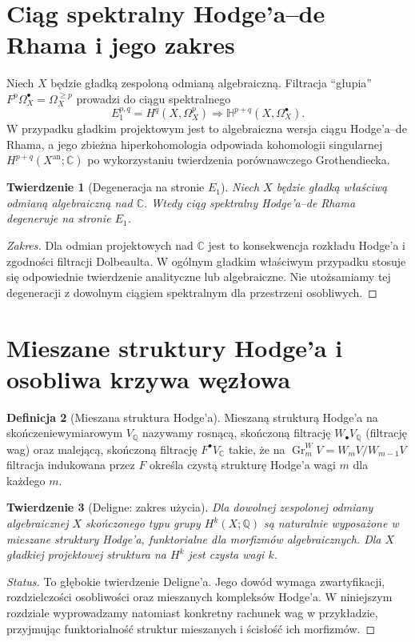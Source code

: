 \documentclass[11pt,a4paper,oneside]{report}
\newcommand{\C}{\mathbb{C}}
\newcommand{\Q}{\mathbb{Q}}
\theoremstyle{plain}
\newtheorem{twierdzenie}{Twierdzenie}[section]
\theoremstyle{definition}
\newtheorem{definicja}[twierdzenie]{Definicja}
\theoremstyle{remark}
\begin{document}
\section{Ciąg spektralny Hodge'a--de Rhama i jego zakres}
Niech $X$ będzie gładką zespoloną odmianą algebraiczną.
Filtracja ``głupia'' $F^p\Omega_X^\bullet=
\Omega_X^{\ge p}$ prowadzi do ciągu spektralnego
\[
E_1^{p,q}=H^q(X,\Omega_X^p)
\Longrightarrow\mathbb H^{p+q}(X,\Omega_X^\bullet).
\]
W przypadku gładkim projektowym jest to algebraiczna
wersja ciągu Hodge'a--de Rhama, a jego zbieżna
hiperkohomologia odpowiada kohomologii singularnej
$H^{p+q}(X^{\mathrm{an}};\C)$ po wykorzystaniu
twierdzenia porównawczego Grothendiecka.
\begin{twierdzenie}[Degeneracja na stronie $E_1$]
Niech $X$ będzie gładką właściwą odmianą algebraiczną
nad $\C$. Wtedy ciąg spektralny Hodge'a--de Rhama
degeneruje na stronie $E_1$.
\end{twierdzenie}
\begin{proof}[Zakres]
Dla odmian projektowych nad $\C$ jest to konsekwencja
rozkładu Hodge'a i zgodności filtracji Dolbeaulta.
W ogólnym gładkim właściwym przypadku stosuje się
odpowiednie twierdzenie analityczne lub algebraiczne.
Nie utożsamiamy tej degeneracji z dowolnym
ciągiem spektralnym dla przestrzeni osobliwych.
\end{proof}

\section{Mieszane struktury Hodge'a i osobliwa krzywa węzłowa}
\begin{definicja}[Mieszana struktura Hodge'a]
Mieszaną strukturą Hodge'a na skończeniewymiarowym
$V_{\Q}$ nazywamy rosnącą, skończoną filtrację
$W_\bullet V_{\Q}$ (filtrację wag) oraz malejącą,
skończoną filtrację $F^\bullet V_{\C}$ takie, że
na $\operatorname{Gr}_m^WV=W_mV/W_{m-1}V$
filtracja indukowana przez $F$ określa czystą
strukturę Hodge'a wagi $m$ dla każdego $m$.
\end{definicja}
\begin{twierdzenie}[Deligne: zakres użycia]
Dla dowolnej zespolonej odmiany algebraicznej $X$
skończonego typu grupy $H^k(X;\Q)$ są naturalnie
wyposażone w mieszane struktury Hodge'a, funktorialne
dla morfizmów algebraicznych. Dla $X$ gładkiej
projektowej struktura na $H^k$ jest czysta wagi $k$.
\end{twierdzenie}
\begin{proof}[Status]
To głębokie twierdzenie Deligne'a. Jego dowód
wymaga zwartyfikacji, rozdzielczości osobliwości
oraz mieszanych kompleksów Hodge'a. W niniejszym
rozdziale wyprowadzamy natomiast konkretny rachunek
wag w przykładzie, przyjmując funktorialność
struktur mieszanych i ścisłość ich morfizmów.
\end{proof}
\end{document}

